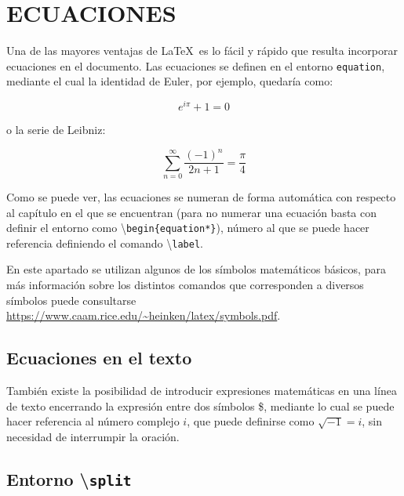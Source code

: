 \documentclass[a4paper, 11pt, spanish, twoside]{article}
\begin{document}



\newpage
\section{ECUACIONES} \label{sec:ecuaciones}

Una de las mayores ventajas de \LaTeX \ es lo fácil y rápido que resulta incorporar ecuaciones en el documento. Las ecuaciones se definen en el entorno \texttt{equation}, mediante el cual la identidad de Euler, por ejemplo, quedaría como:

\begin{equation}
    e^{i\pi} + 1 = 0
    \label{eq:euler}
\end{equation}

o la serie de Leibniz:

\begin{equation}
    \sum_{n=0}^\infty \frac{(-1)^n}{2n+1} = \frac{\pi}{4}
    \label{eq:leibniz}
\end{equation}

Como se puede ver, las ecuaciones se numeran de forma automática con respecto al capítulo en el que se encuentran (para no numerar una ecuación basta con definir el entorno como \textbackslash\texttt{begin\{equation*\}}), número al que se puede hacer referencia definiendo el comando \textbackslash\texttt{label}.

En este apartado se utilizan algunos de los símbolos matemáticos básicos, para más información sobre los distintos comandos que corresponden a diversos símbolos puede consultarse \url{https://www.caam.rice.edu/~heinken/latex/symbols.pdf}.


\subsection{Ecuaciones en el texto}

También existe la posibilidad de introducir expresiones matemáticas en una línea de texto encerrando la expresión entre dos símbolos \$, mediante lo cual se puede hacer referencia al número complejo $i$, que puede definirse como $\sqrt{-1}=i$, sin necesidad de interrumpir la oración.


\subsection{Entorno \textbackslash\texttt{split}}
\end{document}
